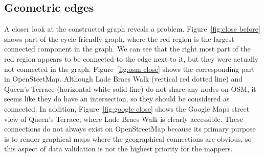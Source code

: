 \documentclass[12pt,a4paper]{report}
\begin{document}
\subsection{Geometric edges}
A closer look at the constructed graph reveals a problem. Figure~\ref{fig:close before} shows part of the cycle-friendly graph, where the red region is the largest connected component in the graph. We can see that the right most part of the red region appears to be connected to the edge next to it, but they were actually not connected in the graph. Figure~\ref{fig:osm close} shows the corresponding part in OpenSteetMap. Although Lade Braes Walk (vertical red dotted line) and Queen's Terrace (horizontal white solid line) do not share any nodes on OSM, it seems like they do have an intersection, so they should be considered as connected. In addition, Figure~\ref{fig:google close} shows the Google Maps street view of Queen's Terrace, where Lade Braes Walk is clearly accessible. These connections do not always exist on OpenStreetMap because its primary purpose is to render graphical maps where the geographical connections are obvious, so this aspect of data validation is not the highest priority for the mappers.
\end{document}
